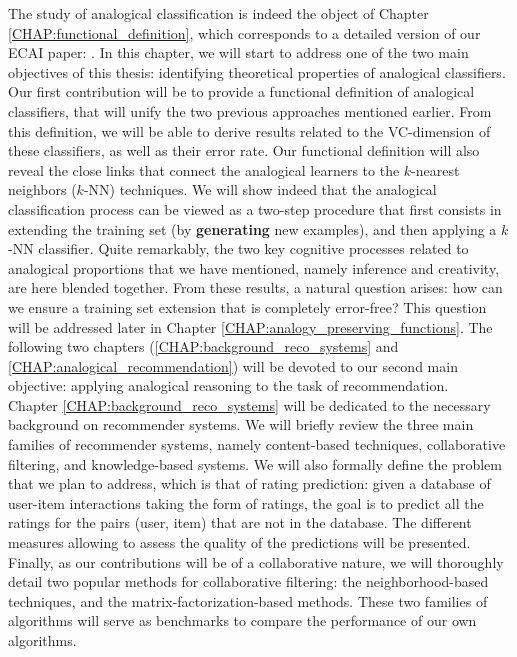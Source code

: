 The study of analogical classification is indeed the object of Chapter
\ref{CHAP:functional_definition}, which corresponds to a detailed version of our
ECAI paper: \cite{HugPraRicSerECAI16}. In this chapter, we will start to
address one of the two main objectives of this thesis: identifying theoretical
properties of analogical classifiers. Our first contribution will be to provide
a functional definition of analogical classifiers, that will unify the two
previous approaches mentioned earlier. From this definition, we will be able to
derive results related to the VC-dimension of these classifiers, as well as
their error rate. Our functional definition will also reveal the close links
that connect the analogical learners to the $k$-nearest neighbors ($k$-NN)
techniques. We will show indeed that the analogical classification process can
be viewed as a two-step procedure that first consists in extending the training
set (by \textbf{generating} new examples), and then applying a $k$-NN
classifier. Quite remarkably, the two key cognitive processes related to
analogical proportions that we have mentioned, namely inference and creativity,
are here blended together. From these results, a natural question arises: how
can we ensure a training set extension that is completely error-free? This
question will be addressed later in Chapter
\ref{CHAP:analogy_preserving_functions}. The  following two chapters
(\ref{CHAP:background_reco_systems} and \ref{CHAP:analogical_recommendation})
will be devoted to our second main objective: applying analogical reasoning to
the task of recommendation.\\

Chapter \ref{CHAP:background_reco_systems} will be dedicated to the necessary
background on recommender systems. We will briefly review the three main
families of recommender systems, namely content-based techniques, collaborative
filtering, and knowledge-based systems. We will also formally define the
problem that we plan to address, which is that of rating prediction: given a
database of  user-item interactions taking the form of ratings, the goal is to
predict all the ratings for the pairs (user, item) that are not in the
database. The different measures allowing to assess the quality of the
predictions will be presented. Finally, as our contributions will be of a
collaborative nature, we will thoroughly detail two popular methods for
collaborative filtering: the neighborhood-based techniques, and the
matrix-factorization-based methods. These two families of algorithms will serve
as benchmarks to compare the performance of our own algorithms.\\

